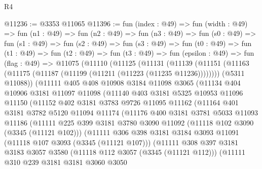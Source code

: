 \begin{lexlean}{R4}
\begin{coremodule}
@11236 := @3353 @11065
@11396 := fun (index : @49) =>
  fun (width : @49) =>
  fun (n1 : @49) =>
  fun (n2 : @49) =>
  fun (n3 : @49) =>
  fun (s0 : @49) =>
  fun (s1 : @49) =>
  fun (s2 : @49) =>
  fun (s3 : @49) =>
  fun (t0 : @49) =>
  fun (t1 : @49) =>
  fun (t2 : @49) =>
  fun (t3 : @49) =>
  fun (epsilon : @49) =>
  fun (flag : @49) =>
  @11075
    (@11110
      (@11125
        (@11131
          (@11139
            (@11151 (@11163 (@11175 (@11187 (@11199 (@11211 (@11223 (@11235 @11236))))))))
            (@5311 @11088))
          (@11111
            @405
            @408
            @10908
            @3184
            @11098
            @3065
            (@11134
              @404
              @10906
              @3181
              @11097
              @11098
              (@11140
                @403
                @3181
                @5325
                @10953
                @11096
                @11150
                (@11152
                  @402
                  @3181
                  @3783
                  @9726
                  @11095
                  @11162
                  (@11164
                    @401
                    @3181
                    @3782
                    @5120
                    @11094
                    @11174
                    (@11176
                      @400
                      @3181
                      @3781
                      @5033
                      @11093
                      @11186
                      (@11111
                        @225
                        @399
                        @3181
                        @3780
                        @3090
                        @11092
                        (@11118 @102 @3090 (@3345 (@11121 @102)))
                        (@11111
                          @306
                          @398
                          @3181
                          @3184
                          @3093
                          @11091
                          (@11118 @107 @3093 (@3345 (@11121 @107)))
                          (@11111
                            @308
                            @397
                            @3181
                            @3183
                            @3057
                            @3580
                            (@11118 @112 @3057 (@3345 (@11121 @112)))
                            (@11111
                              @310
                              @239
                              @3181
                              @3181
                              @3060
                              @3050

\end{coremodule}
\end{lexlean}
